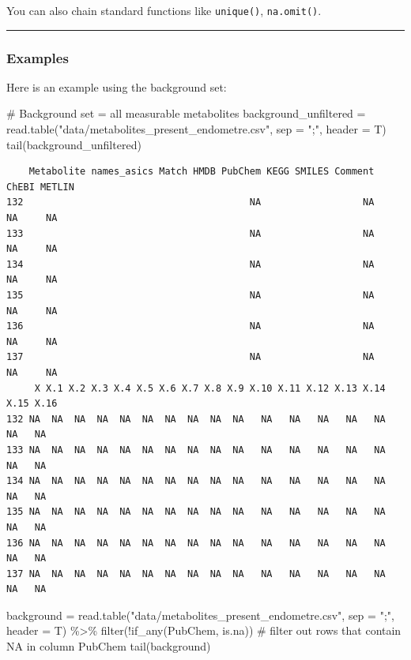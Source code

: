\documentclass[
  24px,
  letterpaper,
  DIV=11,
  numbers=noendperiod]{scrartcl}
\newenvironment{Shaded}{\begin{snugshade}}{\end{snugshade}}
\newcommand{\AttributeTok}[1]{\textcolor[rgb]{0.40,0.45,0.13}{#1}}
\newcommand{\CommentTok}[1]{\textcolor[rgb]{0.37,0.37,0.37}{#1}}
\newcommand{\FunctionTok}[1]{\textcolor[rgb]{0.28,0.35,0.67}{#1}}
\newcommand{\NormalTok}[1]{\textcolor[rgb]{0.00,0.23,0.31}{#1}}
\newcommand{\OtherTok}[1]{\textcolor[rgb]{0.00,0.23,0.31}{#1}}
\newcommand{\SpecialCharTok}[1]{\textcolor[rgb]{0.37,0.37,0.37}{#1}}
\newcommand{\StringTok}[1]{\textcolor[rgb]{0.13,0.47,0.30}{#1}}
\begin{document}
You can also chain standard functions like \texttt{unique()},
\texttt{na.omit()}.

\begin{center}\rule{0.5\linewidth}{0.5pt}\end{center}

\hypertarget{examples}{%
\subsubsection{Examples}\label{examples}}

Here is an example using the background set:

\begin{Shaded}
\begin{Highlighting}[]
\CommentTok{\# Background set = all measurable metabolites}
\NormalTok{background\_unfiltered }\OtherTok{=} \FunctionTok{read.table}\NormalTok{(}\StringTok{"data/metabolites\_present\_endometre.csv"}\NormalTok{, }\AttributeTok{sep =} \StringTok{";"}\NormalTok{, }\AttributeTok{header =}\NormalTok{ T)}
\FunctionTok{tail}\NormalTok{(background\_unfiltered)}
\end{Highlighting}
\end{Shaded}

\begin{verbatim}
    Metabolite names_asics Match HMDB PubChem KEGG SMILES Comment ChEBI METLIN
132                                        NA                  NA    NA     NA
133                                        NA                  NA    NA     NA
134                                        NA                  NA    NA     NA
135                                        NA                  NA    NA     NA
136                                        NA                  NA    NA     NA
137                                        NA                  NA    NA     NA
     X X.1 X.2 X.3 X.4 X.5 X.6 X.7 X.8 X.9 X.10 X.11 X.12 X.13 X.14 X.15 X.16
132 NA  NA  NA  NA  NA  NA  NA  NA  NA  NA   NA   NA   NA   NA   NA   NA   NA
133 NA  NA  NA  NA  NA  NA  NA  NA  NA  NA   NA   NA   NA   NA   NA   NA   NA
134 NA  NA  NA  NA  NA  NA  NA  NA  NA  NA   NA   NA   NA   NA   NA   NA   NA
135 NA  NA  NA  NA  NA  NA  NA  NA  NA  NA   NA   NA   NA   NA   NA   NA   NA
136 NA  NA  NA  NA  NA  NA  NA  NA  NA  NA   NA   NA   NA   NA   NA   NA   NA
137 NA  NA  NA  NA  NA  NA  NA  NA  NA  NA   NA   NA   NA   NA   NA   NA   NA
\end{verbatim}

\begin{Shaded}
\begin{Highlighting}[]
\NormalTok{background }\OtherTok{=} \FunctionTok{read.table}\NormalTok{(}\StringTok{"data/metabolites\_present\_endometre.csv"}\NormalTok{, }\AttributeTok{sep =} \StringTok{";"}\NormalTok{, }\AttributeTok{header =}\NormalTok{ T) }\SpecialCharTok{\%\textgreater{}\%} 
  \FunctionTok{filter}\NormalTok{(}\SpecialCharTok{!}\FunctionTok{if\_any}\NormalTok{(PubChem, is.na))  }\CommentTok{\# filter out rows that contain NA in column PubChem}
\FunctionTok{tail}\NormalTok{(background)}
\end{Highlighting}
\end{Shaded}
\end{document}
